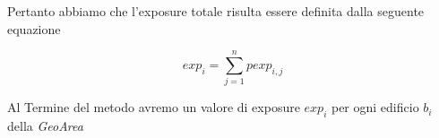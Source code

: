 Pertanto abbiamo che l'exposure totale risulta essere definita dalla seguente equazione

\begin{equation}\label{eq:exposure1}
exp_i =\sum_{j=1}^n pexp_{i,j}
\end{equation}

\bigbreak

Al Termine del metodo avremo un valore di exposure $exp_i$ per ogni edificio $b_i$ della \textit{GeoArea}






